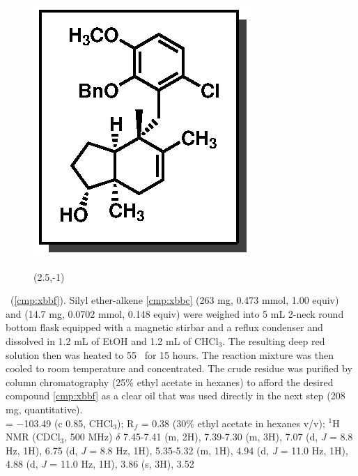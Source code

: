 \vspace{10pt}
\begin{figure}
  \vspace{-25pt}
  \begin{center}
    \includegraphics[scale=0.8]{chp_singlecarbon/images/xbbf}
    \begin{textblock}{1}(2.5,-1)  \end{textblock}
  \end{center}
  \vspace{-30pt}
\end{figure}\noindent \textbf{\CMPxbbf}\ (\ref{cmp:xbbf}). Silyl ether-alkene \ref{cmp:xbbc}
(263 mg, 0.473 mmol, 1.00 equiv) and  (14.7 mg, 0.0702 mmol, 0.148 equiv) were weighed
into 5 mL 2-neck round bottom flask equipped with a magnetic stirbar and a reflux condenser and dissolved in
1.2 mL of EtOH and 1.2 mL of CHCl$_3$. The resulting deep red solution then
was heated to 55 \degc\  for 15 hours. The reaction mixture was then cooled to room temperature and
concentrated. The crude residue was purified by column chromatography (25\% ethyl acetate in
hexanes) to afford the desired compound \ref{cmp:xbbf} as a clear oil that was used directly in the
next step (208 mg, quantitative).\\
\rotation = $-$103.49 (c 0.85, CHCl$_3$); R$_f$ = 0.38 (30\% ethyl acetate in hexanes v/v); $^1$H NMR (CDCl$_3$,
500 MHz) $\delta$ 7.45-7.41 (m, 2H), 7.39-7.30 (m, 3H), 7.07 (d, \textit{J} = 8.8 Hz, 1H), 6.75 (d, \textit{J} = 8.8 Hz,
1H), 5.35-5.32 (m, 1H), 4.94 (d, \textit{J} = 11.0 Hz, 1H), 4.88 (d, \textit{J} = 11.0 Hz, 1H), 3.86 (s, 3H), 3.52
